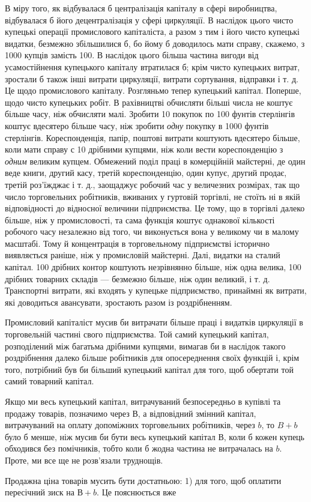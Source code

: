 \parcont{}  %
В міру того, як відбувалася б централізація капіталу в сфері
виробництва, відбувалася б його децентралізація у сфері циркуляції.
В наслідок цього чисто купецькі операції промислового
капіталіста, а разом з тим і його чисто купецькі видатки, безмежно
збільшилися б, бо йому б доводилось мати справу, скажемо,
з 1000 купців замість 100. В наслідок цього більша частина
вигоди від усамостійнення купецького капіталу втратилася б;
крім чисто купецьких витрат, зростали б також інші витрати
циркуляції, витрати сортування, відправки і т. д. Це щодо промислового
капіталу. Розгляньмо тепер купецький капітал. Поперше,
щодо чисто купецьких робіт. В рахівництві обчисляти
більші числа не коштує більше часу, ніж обчисляти малі. Зробити
10 покупок по 100 фунтів стерлінгів коштує вдесятеро більше
часу, ніж зробити \emph{одну} покупку в 1000 фунтів стерлінгів. Кореспонденція,
папір, поштові витрати коштують вдесятеро більше,
коли мати справу с 10 дрібними купцями, ніж коли вести кореспонденцію
з \emph{одним} великим купцем. Обмежений поділ праці в комерційній
майстерні, де один веде книги, другий касу, третій
кореспонденцію, один купує, другий продає, третій роз’їжджає
і т. д., заощаджує робочий час у величезних розмірах, так що
число торговельних робітників, вживаних у гуртовій торгівлі,
не стоїть ні в якій відповідності до відносної величини підприємства.
Це тому, що в торгівлі далеко більше, ніж у промисловості,
та сама функція коштує однакової кількості робочого часу
незалежно від того, чи виконується вона у великому чи в малому
масштабі. Тому й концентрація в торговельному підприємстві
історично виявляється раніше, ніж у промисловій майстерні.
Далі, видатки на сталий капітал. 100 дрібних контор коштують
незрівнянно більше, ніж одна велика, 100 дрібних товарних складів
— безмежно більше, ніж один великий, і т. д. Транспортні витрати,
які входять у купецьке підприємство, принаймні як витрати,
які доводиться авансувати, зростають разом із роздрібненням.

Промисловий капіталіст мусив би витрачати більше праці
і видатків циркуляції в торговельній частині свого підприємства.
Той самий купецький капітал, розподілений між багатьма дрібними
купцями, вимагав би в наслідок такого роздрібнення далеко
більше робітників для опосереднення своїх функцій і, крім
того, потрібний був би більший купецький капітал для того,
щоб обертати той самий товарний капітал.

Якщо ми весь купецький капітал, витрачуваний безпосередньо
в купівлі та продажу товарів, позначимо через $В$, а відповідний
змінний капітал, витрачуваний на оплату допоміжних торговельних
робітників, через $b$, то $B + b$ було б менше, ніж мусив би
бути весь купецький капітал В, коли б кожен купець обходився
без помічників, тобто коли б жодна частина не витрачалась на $b$.
Проте, ми все ще не розв’язали труднощів.

Продажна ціна товарів мусить бути достатньою: 1) для того,
щоб оплатити пересічний зиск на $В + b$. Це пояснюється вже
\parbreak{}  %
